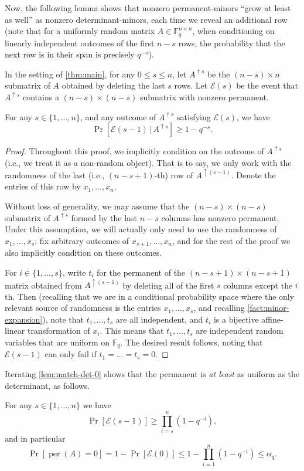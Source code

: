 \documentclass[10pt,reqno]{amsart}
\numberwithin{equation}{section}
\theoremstyle{remark}
\newcommand{\mb}{\mathbb}
\newcommand{\mc}{\mathcal}
\newcommand{\on}{\operatorname}
\begin{document}
Now, the following lemma shows that nonzero permanent-minors ``grow
at least as well'' as nonzero determinant-minors, each time we reveal an additional row (note that for a uniformly random matrix $A\in \mb F_q^{n\times n}$, when conditioning on linearly independent outcomes of the first $n-s$ rows, the probability that the next row is in their span is precisely $q^{-s}$).
\begin{definition}
In the setting of \cref{thm:main}, for any $0\le s\le n$, let $A^{\uparrow s}$ be the $(n-s)\times n$ submatrix
of $A$ obtained by deleting the last $s$ rows. Let $\mathcal{E}(s)$
be the event that $A^{\uparrow s}$ contains a $(n-s)\times(n-s)$
submatrix with nonzero permanent.
\end{definition}

\begin{lemma}
\label{lem:match-det-0}For any $s\in\{1,\dots,n\}$, and any outcome
of $A^{\uparrow s}$ satisfying $\mathcal{E}(s)$, we have
\[
\Pr[\mathcal{E}(s-1)\,|\,A^{\uparrow s}]\ge1-q^{-s}.
\]
\end{lemma}

\begin{proof}
Throughout this proof, we implicitly condition on the outcome of $A^{\uparrow s}$ (i.e., we treat it as a non-random object). That is to say, we only work with the randomness of the last (i.e., $(n-s+1)$-th) row of $A^{\uparrow (s-1)}$. Denote the entries of this row by $x_1,\dots,x_n$.

Without loss of generality, we may assume that the $(n-s)\times(n-s)$ submatrix
of $A^{\uparrow s}$ formed by the last $n-s$ columns has nonzero permanent. Under this assumption, we will actually only need to use the randomness of $x_1,\dots,x_s$: fix arbitrary outcomes of $x_{s+1},\dots,x_n$, and for the rest of the proof we also implicitly condition on these outcomes.

For $i\in\{1,\dots,s\}$, write $t_{i}$ for the permanent of the $(n-s+1)\times (n-s+1)$
matrix obtained from $A^{\uparrow (s-1)}$ by deleting all of the first
$s$ columns except the $i$th. Then (recalling that we are in a conditional probability space where the only relevant source of randomness is the entries $x_1,\dots,x_s$, and recalling \cref{fact:minor-expansion}), note that $t_{1},\dots,t_{s}$ are all independent, and $t_{i}$ is a bijective 
affine-linear transformation of $x_{i}$. %
This means that $t_1,\dots,t_s$ are independent random variables that are uniform on $\mb F_q$. The desired result follows, noting that $\mc E(s-1)$ can only fail if $t_1=\dots=t_s=0$.
\end{proof}
Iterating \cref{lem:match-det-0} shows that the permanent is \emph{at
least} as uniform as the determinant, as follows.
\begin{corollary}
\label{lem:match-det}For any $s\in\{1,\dots,n\}$ we have 
\[
\Pr[\mathcal{E}(s-1)]\ge\prod_{i=s}^{n}(1-q^{-i}),
\]
and in particular
\[
\Pr[\on{per}(A)=0]=1-\Pr[\mathcal{E}(0)]\le1-\prod_{i=1}^{n}(1-q^{-i})\le \alpha_{q}.
\]
\end{corollary}
\end{document}
